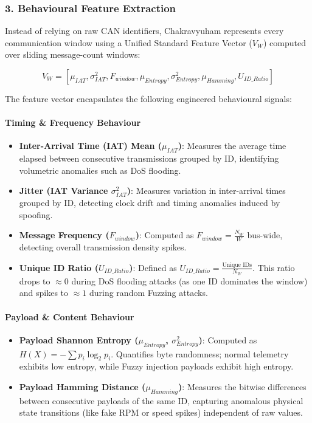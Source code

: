 \documentclass{article}
\begin{document}
\subsubsection{3. Behavioural Feature Extraction}
Instead of relying on raw CAN identifiers, Chakravyuham represents every communication window using a Unified Standard Feature Vector ($V_W$) computed over sliding message-count windows:

$$V_W = [ \mu_{IAT}, \sigma^2_{IAT}, F_{window}, \mu_{Entropy}, \sigma^2_{Entropy}, \mu_{Hamming}, U_{ID\_Ratio} ]$$

The feature vector encapsulates the following engineered behavioural signals:

\paragraph{Timing \& Frequency Behaviour}
\begin{itemize}[noitemsep]
    \item \textbf{Inter-Arrival Time (IAT) Mean ($\mu_{IAT}$)}: Measures the average time elapsed between consecutive transmissions grouped by ID, identifying volumetric anomalies such as DoS flooding.
    \item \textbf{Jitter (IAT Variance $\sigma^2_{IAT}$)}: Measures variation in inter-arrival times grouped by ID, detecting clock drift and timing anomalies induced by spoofing.
    \item \textbf{Message Frequency ($F_{window}$)}: Computed as $F_{window} = \frac{N_W}{W}$ bus-wide, detecting overall transmission density spikes.
    \item \textbf{Unique ID Ratio ($U_{ID\_Ratio}$)}: Defined as $U_{ID\_Ratio} = \frac{\text{Unique IDs}}{N_W}$. This ratio drops to $\approx 0$ during DoS flooding attacks (as one ID dominates the window) and spikes to $\approx 1$ during random Fuzzing attacks.
\end{itemize}

\paragraph{Payload \& Content Behaviour}
\begin{itemize}[noitemsep]
    \item \textbf{Payload Shannon Entropy ($\mu_{Entropy}$, $\sigma^2_{Entropy}$)}: Computed as $H(X) = - \sum p_i \log_2 p_i$. Quantifies byte randomness; normal telemetry exhibits low entropy, while Fuzzy injection payloads exhibit high entropy.
    \item \textbf{Payload Hamming Distance ($\mu_{Hamming}$)}: Measures the bitwise differences between consecutive payloads of the same ID, capturing anomalous physical state transitions (like fake RPM or speed spikes) independent of raw values.
\end{itemize}
\end{document}
